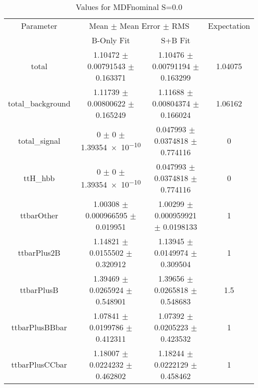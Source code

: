 \begin{table}
\centering
\caption{Values for MDFnominal S=0.0}
\begin{tabular}{cccc}
\toprule
Parameter & \multicolumn{2}{c}{Mean $\pm$ Mean Error $\pm$ RMS} & Expectation\\
 & B-Only Fit & S+B Fit & \\
\midrule
total & \num{1.10472} $\pm$ \num{0.00791543} $\pm$ \num{0.163371} & \num{1.10476} $\pm$ \num{0.00791194} $\pm$ \num{0.163299} & \num{1.04075}\\
total\_background & \num{1.11739} $\pm$ \num{0.00800622} $\pm$ \num{0.165249} & \num{1.11688} $\pm$ \num{0.00804374} $\pm$ \num{0.166024} & \num{1.06162}\\
total\_signal & \num{0} $\pm$ \num{0} $\pm$ \num{1.39354e-10} & \num{0.047993} $\pm$ \num{0.0374818} $\pm$ \num{0.774116} & \num{0}\\
ttH\_hbb & \num{0} $\pm$ \num{0} $\pm$ \num{1.39354e-10} & \num{0.047993} $\pm$ \num{0.0374818} $\pm$ \num{0.774116} & \num{0}\\
ttbarOther & \num{1.00308} $\pm$ \num{0.000966595} $\pm$ \num{0.019951} & \num{1.00299} $\pm$ \num{0.000959921} $\pm$ \num{0.0198133} & \num{1}\\
ttbarPlus2B & \num{1.14821} $\pm$ \num{0.0155502} $\pm$ \num{0.320912} & \num{1.13945} $\pm$ \num{0.0149974} $\pm$ \num{0.309504} & \num{1}\\
ttbarPlusB & \num{1.39469} $\pm$ \num{0.0265924} $\pm$ \num{0.548901} & \num{1.39656} $\pm$ \num{0.0265818} $\pm$ \num{0.548683} & \num{1.5}\\
ttbarPlusBBbar & \num{1.07841} $\pm$ \num{0.0199786} $\pm$ \num{0.412311} & \num{1.07392} $\pm$ \num{0.0205223} $\pm$ \num{0.423532} & \num{1}\\
ttbarPlusCCbar & \num{1.18007} $\pm$ \num{0.0224232} $\pm$ \num{0.462802} & \num{1.18244} $\pm$ \num{0.0222129} $\pm$ \num{0.458462} & \num{1}\\
\bottomrule
\end{tabular}
\end{table}